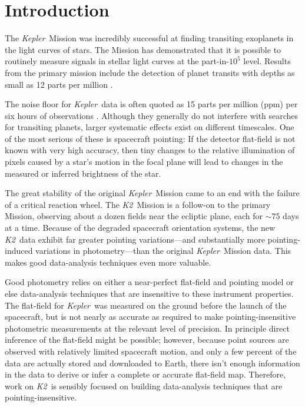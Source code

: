 \documentclass[12pt,preprint]{aastex}
\newcommand{\project}[1]{\textsl{#1}} %
\newcommand{\kepler}{\project{Kepler}}
\newcommand{\KT}{\project{K2}}
\begin{document}

\section{Introduction}

The \kepler\ Mission was incredibly successful at finding transiting
exoplanets in the light curves of stars.
The Mission has demonstrated that it is possible to routinely measure signals
in stellar light curves at the part-in-$10^5$ level.
Results from the primary mission include the detection of planet transits with
depths as small as 12 parts per million \citep{Barclay:2013}.

The noise floor for \kepler\ data is often quoted as 15 parts per million
(ppm) per six hours of observations \citep{Gilliland:2011}.
Although they generally do not interfere with searches for transiting
planets, larger systematic effects exist on different timescales.
One of the most serious of these is spacecraft pointing: If the detector
flat-field is not known with very high accuracy, then tiny changes to the
relative illumination of pixels caused by a star's motion in the focal plane
will lead to changes in the measured or inferred brightness of the star.

The great stability of the original \kepler\ Mission
came to an end with the failure of a critical reaction wheel.
The \KT\ Mission \citep{Howell:2014} is a follow-on to the primary Mission,
observing about a dozen fields near the ecliptic plane, each for
$\sim 75$ days at a time.
Because of the degraded spacecraft orientation systems, the new \KT\ data
exhibit far greater pointing variations---and substantially more
pointing-induced variations in photometry---than the original \kepler\ Mission
data.
This makes good data-analysis techniques even more valuable.

Good photometry relies on either a near-perfect flat-field
and pointing model or else data-analysis techniques that are
insensitive to these instrument properties.
The flat-field for \kepler\ was measured on the ground before the launch of
the spacecraft, but is not nearly as accurate as required to make
pointing-insensitive photometric measurements at the relevant level of
precision.
In principle direct inference of the flat-field might be possible;
however, because point sources are observed with relatively limited
spacecraft motion, and only a few percent of the data are actually stored and
downloaded to Earth, there isn't enough information in the data to derive or
infer a complete or accurate flat-field map.
Therefore, work on \KT\ is sensibly focused on building data-analysis
techniques that are pointing-insensitive.
\end{document}
